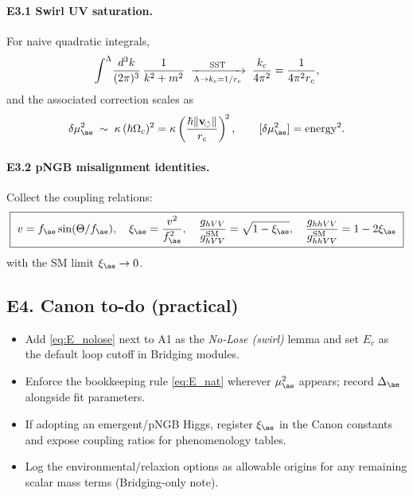\documentclass[11pt]{article}
\begin{document}
\paragraph{E3.1 Swirl UV saturation.}
For naive quadratic integrals,
\begin{equation}
\int^{\Lambda}\!\frac{d^3k}{(2\pi)^3}\,\frac{1}{k^2+m^2}
\;\xrightarrow[\Lambda\to k_c=1/r_c]{\rm SST}\;
\frac{k_c}{4\pi^2}=\frac{1}{4\pi^2 r_c},
\end{equation}
and the associated correction scales as
\begin{equation}
\delta\mu_{\ae}^2 \;\sim\; \kappa\,(\hbar\Omega_c)^2
=\kappa\left(\frac{\hbar\|{\bf v}_{\!\circlearrowleft}\|}{r_c}\right)^{\!2},\qquad
[\delta\mu_{\ae}^2]={\rm energy}^2.
\end{equation}

\paragraph{E3.2 pNGB misalignment identities.}
Collect the coupling relations:
\begin{equation}
\boxed{\
v=f_{\ae}\sin(\Theta/f_{\ae}),\quad
\xi_{\ae}=\frac{v^2}{f_{\ae}^2},\quad
\frac{g_{hVV}}{g_{hVV}^{\rm SM}}=\sqrt{1-\xi_{\ae}},\quad
\frac{g_{hhVV}}{g_{hhVV}^{\rm SM}}=1-2\xi_{\ae}\
}
\end{equation}
with the SM limit $\xi_{\ae}\to0$.

\subsection*{E4. Canon to-do (practical)}
\begin{itemize}
\item Add \eqref{eq:E_nolose} next to A1 as the \emph{No-Lose (swirl)} lemma and set $E_c$ as the default loop cutoff in Bridging modules.
\item Enforce the bookkeeping rule \eqref{eq:E_nat} wherever $\mu_{\ae}^2$ appears; record $\Delta_{\ae}$ alongside fit parameters.
\item If adopting an emergent/pNGB Higgs, register $\xi_{\ae}$ in the Canon constants and expose coupling ratios for phenomenology tables.
\item Log the environmental/relaxion options as allowable origins for any remaining scalar mass terms (Bridging-only note).
\end{itemize}
\end{document}
